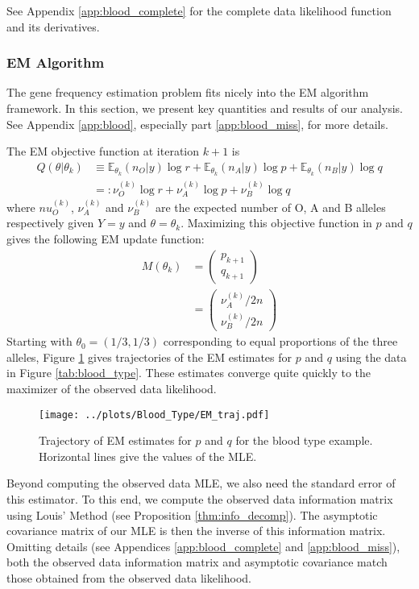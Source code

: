 \documentclass[11pt, oneside]{article}   	%
\newcommand{\bE}{\mathbb{E}}
\begin{document}
See Appendix \ref{app:blood_complete} for the complete data likelihood function and its derivatives.

\subsubsection{EM Algorithm}

The gene frequency estimation problem fits nicely into the EM algorithm framework. In this section, we present key quantities and results of our analysis. See Appendix \ref{app:blood}, especially part \ref{app:blood_miss}, for more details.

The EM objective function at iteration $k+1$ is
%
\begin{align}
    Q(\theta|\theta_k) &\equiv  \bE_{\theta_k}(n_O | y) \log r + \bE_{\theta_k}(n_A | y) \log p + \bE_{\theta_k}(n_B | y) \log q\\
    &=: \nu^{(k)}_O \log r + \nu^{(k)}_A \log p + \nu^{(k)}_B \log q
\end{align}
%
where $nu^{(k)}_O$, $\nu^{(k)}_A$ and $\nu^{(k)}_B$ are the expected number of O, A and B alleles respectively given $Y=y$ and $\theta = \theta_k$. Maximizing this objective function in $p$ and $q$ gives the following EM update function:
%
\begin{align}
    M(\theta_k) &= \begin{pmatrix}
        p_{k+1}\\
        q_{k+1}
    \end{pmatrix}\\    
    &= \begin{pmatrix}
        \nu^{(k)}_A / 2n\\
        \nu^{(k)}_B / 2n
    \end{pmatrix}
\end{align}
%
Starting with $\theta_0 = (1/3, 1/3)$ corresponding to equal proportions of the three alleles, Figure \ref{fig:blood_EM_traj} gives trajectories of the EM estimates for $p$ and $q$ using the data in Figure \ref{tab:blood_type}. These estimates converge quite quickly to the maximizer of the observed data likelihood.
%
\begin{figure}
    \centering
    \caption{Trajectory of EM estimates for $p$ and $q$ for the blood type example. Horizontal lines give the values of the MLE.}
    \label{fig:blood_EM_traj}
    \texttt{[image: ../plots/Blood\_Type/EM\_traj.pdf]}
\end{figure}
%
Beyond computing the observed data MLE, we also need the standard error of this estimator. To this end, we compute the observed data information matrix using Louis' Method (see Proposition \ref{thm:info_decomp}). The asymptotic covariance matrix of our MLE is then the inverse of this information matrix. Omitting details (see Appendices \ref{app:blood_complete} and \ref{app:blood_miss}), both the observed data information matrix and asymptotic covariance match those obtained from the observed data likelihood. 
%
\end{document}

